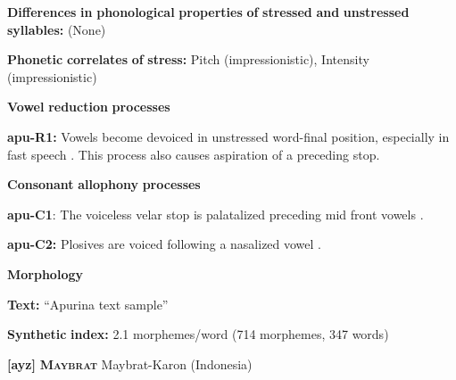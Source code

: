\begin{styleBody}
\textbf{Differences} \textbf{in} \textbf{phonological} \textbf{properties} \textbf{of} \textbf{stressed} \textbf{and} \textbf{unstressed} \textbf{syllables:} (None)
\end{styleBody}

\begin{styleBody}
\textbf{Phonetic} \textbf{correlates} \textbf{of} \textbf{stress:} Pitch (impressionistic), Intensity (impressionistic)
\end{styleBody}

\begin{styleBody}
\textbf{Vowel} \textbf{reduction} \textbf{processes}
\end{styleBody}

\begin{styleBody}
\textbf{apu-R1:} Vowels become devoiced in unstressed word-final position, especially in fast speech \citep[60-1]{Facundes2000}. This process also causes aspiration of a preceding stop.
\end{styleBody}

\begin{styleBody}
\textbf{Consonant} \textbf{allophony} \textbf{processes}
\end{styleBody}

\begin{styleBody}
\textbf{apu-C1}: The voiceless velar stop is palatalized preceding mid front vowels \citep[76]{Facundes2000}.
\end{styleBody}

\begin{styleBody}
\textbf{apu-C2:} Plosives are voiced following a nasalized vowel \citep[73]{Facundes2000}.
\end{styleBody}

\begin{styleBody}
\textbf{Morphology}
\end{styleBody}

\begin{styleBody}
\textbf{Text:} “Apurina text sample” \citep[625-642]{Facundes2000}
\end{styleBody}

\begin{styleBody}
\textbf{Synthetic} \textbf{index:} 2.1 morphemes/word (714 morphemes, 347 words)
\end{styleBody}

\begin{styleBody}
\textbf{[ayz]}   \textbf{\textsc{Maybrat}}  Maybrat-Karon (Indonesia)
\end{styleBody}

